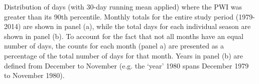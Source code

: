\label{fig:annual_distribution}
Distribution of days (with 30-day running mean applied) where the PWI was greater than its 90th percentile. Monthly totals for the entire study period (1979-2014) are shown in panel (a), while the total days for each individual season are shown in panel (b). To account for the fact that not all months have an equal number of days, the counts for each month (panel a) are presented as a percentage of the total number of days for that month. Years in panel (b) are defined from December to November (e.g. the `year' 1980 spans December 1979 to November 1980). 
